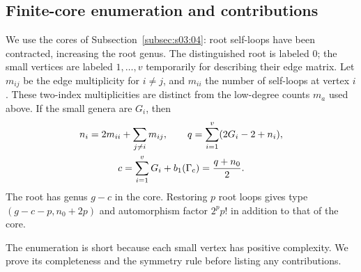 \subsection{Finite-core enumeration and contributions}
\label{subsec:a:04}

We use the cores of Subsection~\ref{subsec:s03:04}: root self-loops
have been contracted, increasing the root genus. The distinguished
root is labeled $0$; the small vertices are labeled $1,\ldots,v$
temporarily for describing their edge matrix. Let $m_{ij}$ be the edge
multiplicity for $i\ne j$, and $m_{ii}$ the number of self-loops at
vertex $i$. These two-index multiplicities are distinct from the
low-degree counts $m_a$ used above. If the small genera are $G_i$,
then
\begin{equation}\label{eq:a:core-data}
\begin{gathered}
 n_i=2m_{ii}+\sum_{j\ne i}m_{ij},\qquad
 q=\sum_{i=1}^v(2G_i-2+n_i),\\
 c=\sum_{i=1}^vG_i+b_1(\Gamma_{\rm c})=\frac{q+n_0}{2}.
\end{gathered}
\end{equation}
The root has genus $g-c$ in the core. Restoring $p$ root loops gives
type $(g-c-p,n_0+2p)$ and automorphism factor $2^pp!$ in addition
to that of the core.

The enumeration is short because each small vertex has positive
complexity. We prove its completeness and the symmetry rule before
listing any contributions.

